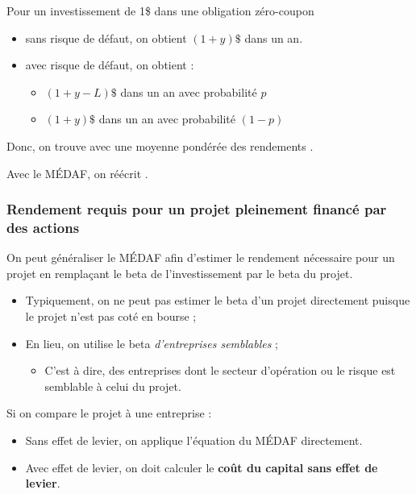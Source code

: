 \documentclass[10pt, french]{article}
\begin{document}
\begin{multicols*}{2}
\begin{definitionNOHFILLsub}
Pour un investissement de 1\$ dans une obligation zéro-coupon
\begin{itemize}
	\item	sans risque de défaut, on obtient $(1 + y)\$$ dans un an.
	\item	avec risque de défaut, on obtient :
		\begin{itemize}
		\item	$(1 + y - L)\$$ dans un an avec probabilité $p$
		\item	$(1 + y)\$$ dans un an avec probabilité $(1 - p)$
		\end{itemize}
\end{itemize}

Donc, on trouve avec une moyenne pondérée des rendements .
\end{definitionNOHFILLsub}

\begin{definitionNOHFILLprop}
Avec le MÉDAF, on réécrit .\\
\end{definitionNOHFILLprop}


\columnbreak
\subsubsection{Rendement requis pour un projet pleinement financé par des actions}
On peut généraliser le MÉDAF afin d'estimer le rendement nécessaire pour un projet en remplaçant le beta de l'investissement par le beta du projet.

\begin{itemize}
	\item	Typiquement, on ne peut pas estimer le beta d'un projet directement puisque le projet n'est pas coté en bourse ;
	\item	En lieu, on utilise le beta \textit{d'entreprises semblables} ;
		\begin{itemize}
		\item	C'est à dire, des entreprises dont le secteur d'opération ou le risque est semblable à celui du projet.
		\end{itemize}
\end{itemize}

Si on compare le projet à une entreprise :
\begin{itemize}
	\item	Sans effet de levier, on applique l'équation du MÉDAF directement.
	\item	Avec effet de levier, on doit calculer le \textbf{coût du capital sans effet de levier}.
\end{itemize}


\end{multicols*}
\end{document}
